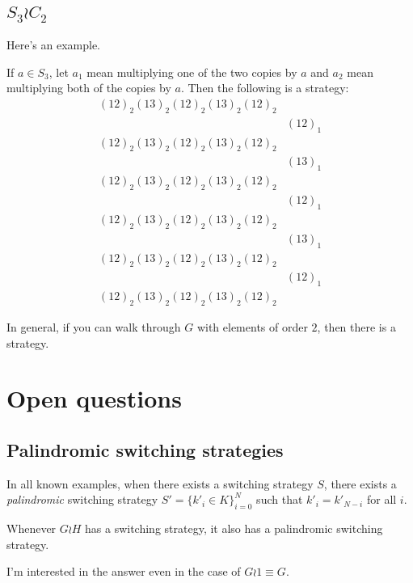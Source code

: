 \subsection{\texorpdfstring{$S_3 \wr C_2$}{Two copies of the symmetric group on three letters}}
Here's an example.
\begin{example}
  If $a \in S_3$, let $a_1$ mean multiplying one of the two copies by $a$ and
  $a_2$ mean multiplying both of the copies by $a$. Then the following is
  a strategy:
  \begin{align*}
    (12)_2(13)_2(12)_2(13)_2(12)_2 \\
    &(12)_1 \\
    (12)_2(13)_2(12)_2(13)_2(12)_2 \\
    &(13)_1 \\
    (12)_2(13)_2(12)_2(13)_2(12)_2 \\
    &(12)_1 \\
    (12)_2(13)_2(12)_2(13)_2(12)_2 \\
    &(13)_1 \\
    (12)_2(13)_2(12)_2(13)_2(12)_2 \\
    &(12)_1 \\
    (12)_2(13)_2(12)_2(13)_2(12)_2
  \end{align*}
  \label{ex:TwoSymmetricGroups}
\end{example}
In general, if you can walk through $G$ with elements of order $2$, then
there is a strategy.
%
%
\section{Open questions}
\label{sec:OpenQuestions}
\subsection{Palindromic switching strategies}
In all known examples, when there exists a switching strategy $S$,
there exists a \textit{palindromic} switching strategy
$S' = \{k'_i \in K\}_{i=0}^N$
such that $k'_i = k'_{N-i}$ for all $i$.
\begin{conjecture}
  Whenever $G \wr H$ has a switching strategy, it also has a palindromic switching
  strategy.
\end{conjecture}

I'm interested in the answer even in the case of $G \wr \mathrm{1} \equiv G$.

